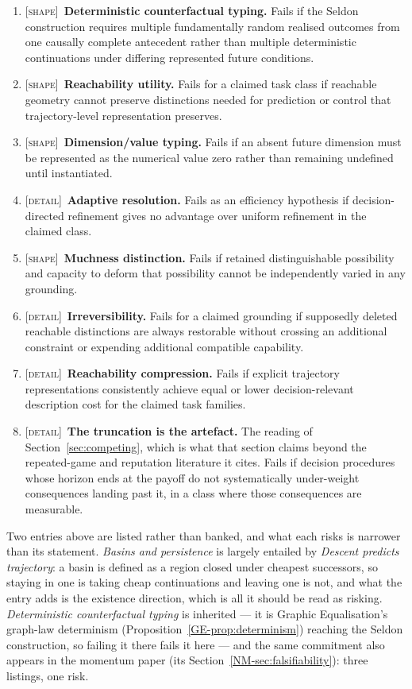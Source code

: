 \documentclass[11pt,a4paper]{article}
\theoremstyle{remark}
\begin{document}
\begin{enumerate}[leftmargin=*]
prediction of Remark~\ref{rem:aperture-shape}. Fails if, for an item lying beyond a frame's
represented horizon, increasing its vividness or the information about it raises its salience as
much as bringing it inside the horizon does.
\item \textsc{[shape]}~\textbf{Deterministic counterfactual typing.} Fails if the Seldon construction requires multiple fundamentally random realised outcomes from one causally complete antecedent rather than multiple deterministic continuations under differing represented future conditions.
\item \textsc{[shape]}~\textbf{Reachability utility.} Fails for a claimed task class if reachable geometry cannot preserve distinctions needed for prediction or control that trajectory-level representation preserves.
\item \textsc{[shape]}~\textbf{Dimension/value typing.} Fails if an absent future dimension must be represented as the numerical value zero rather than remaining undefined until instantiated.
\item \textsc{[detail]}~\textbf{Adaptive resolution.} Fails as an efficiency hypothesis if decision-directed refinement gives no advantage over uniform refinement in the claimed class.
\item \textsc{[shape]}~\textbf{Muchness distinction.} Fails if retained distinguishable possibility and capacity to deform that possibility cannot be independently varied in any grounding.
\item \textsc{[detail]}~\textbf{Irreversibility.} Fails for a claimed grounding if supposedly deleted reachable distinctions are always restorable without crossing an additional constraint or expending additional compatible capability.
\item \textsc{[detail]}~\textbf{Reachability compression.} Fails if explicit trajectory representations consistently achieve equal or lower decision-relevant description cost for the claimed task families.
\item \textsc{[detail]}~\textbf{The truncation is the artefact.} The reading of
Section~\ref{sec:competing}, which is what that section claims beyond the repeated-game and reputation
literature it cites. Fails if decision procedures whose horizon ends at the payoff do not
systematically under-weight consequences landing past it, in a class where those consequences are
measurable.
\end{enumerate}

Two entries above are listed rather than banked, and what each risks is narrower than its statement.
\emph{Basins and persistence} is largely entailed by \emph{Descent predicts trajectory}: a basin is
defined as a region closed under cheapest successors, so staying in one is taking cheap continuations
and leaving one is not, and what the entry adds is the existence direction, which is all it should be
read as risking. \emph{Deterministic counterfactual typing} is inherited --- it is Graphic
Equalisation's graph-law determinism (Proposition~\ref{GE-prop:determinism}) reaching the Seldon
construction, so failing it there fails it here --- and the same commitment also appears in the
momentum paper (its Section~\ref{NM-sec:falsifiability}): three listings, one risk.
\end{document}
